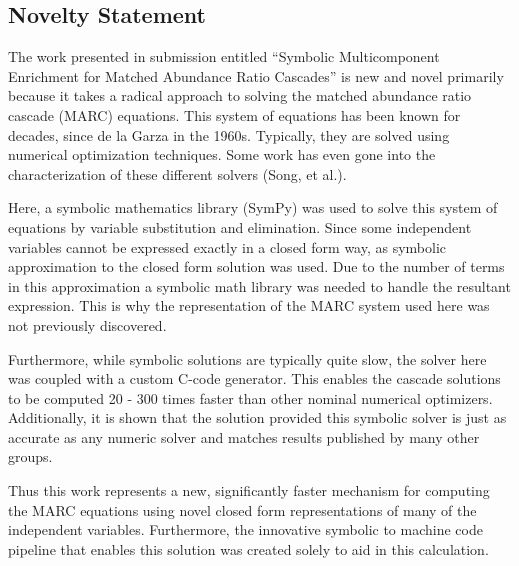 \documentclass[12pt]{article}
\begin{document}
\begin{center}
\section*{Novelty Statement}
\end{center}

The work presented in submission entitled ``Symbolic Multicomponent Enrichment for 
Matched Abundance Ratio Cascades'' is new and novel primarily because it takes 
a radical approach to solving the matched abundance ratio cascade (MARC) equations.  
This system of equations has been known for decades, since de la Garza in the 1960s.
Typically, they are solved using numerical optimization techniques.  Some work
has even gone into the characterization of these different solvers (Song, et al.).

Here, a symbolic mathematics library (SymPy) was used to solve this system
of equations by variable substitution and elimination.  Since some independent 
variables cannot be expressed exactly in a closed form way, as symbolic approximation
to the closed form solution was used.  Due to the number of terms in this
approximation a symbolic math library was needed to handle the resultant expression.
This is why the representation of the MARC system used here was not previously
discovered.

Furthermore, while symbolic solutions are typically quite slow, the solver here 
was coupled with a custom C-code generator.  This enables the cascade solutions to be 
computed 20 - 300 times faster than other nominal numerical optimizers. 
Additionally, it is shown that the solution provided this symbolic solver is 
just as accurate as any numeric solver and matches results published by many 
other groups.

Thus this work represents a new, significantly faster mechanism for computing the 
MARC equations using novel closed form representations of many of the independent 
variables.  Furthermore, the innovative symbolic to machine code pipeline that 
enables this solution was created solely to aid in this calculation.
\end{document}

